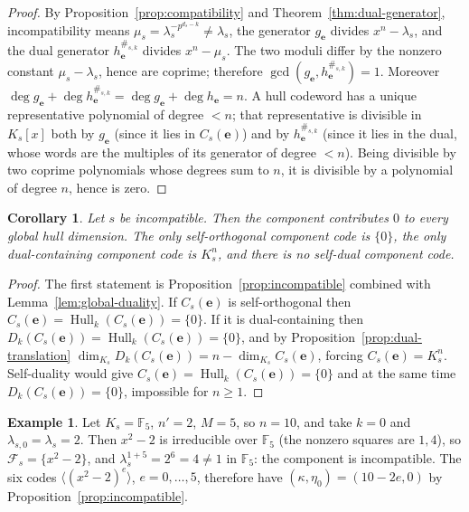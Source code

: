 \documentclass[11pt,a4paper]{article}
\newcommand{\F}{\mathbb F}
\newcommand{\Fs}{\mathcal F_s}
\newcommand{\Hull}{\operatorname{Hull}}
\newcommand{\Dk}{D_k}
\numberwithin{equation}{section}
\theoremstyle{plain}
\newtheorem{corollary}[theorem]{Corollary}
\theoremstyle{definition}
\newtheorem{example}[theorem]{Example}
\theoremstyle{remark}
\begin{document}
\begin{proof}
By Proposition~\ref{prop:compatibility} and Theorem~\ref{thm:dual-generator},
incompatibility means $\mu_s=\lambda_s^{-p^{d_s-k}}\neq\lambda_s$, the generator
$g_{\mathbf{e}}$ divides $x^n-\lambda_s$, and the dual generator
$h_{\mathbf{e}}^{\#_{s,k}}$ divides $x^n-\mu_s$.  The two moduli differ by the
nonzero constant $\mu_s-\lambda_s$, hence are coprime; therefore
$\gcd(g_{\mathbf{e}},h_{\mathbf{e}}^{\#_{s,k}})=1$.  Moreover
$\deg g_{\mathbf{e}}+\deg h_{\mathbf{e}}^{\#_{s,k}}
 =\deg g_{\mathbf{e}}+\deg h_{\mathbf{e}}=n$.
A hull codeword has a unique representative polynomial of degree $<n$; that
representative is divisible in $K_s[x]$ both by $g_{\mathbf{e}}$ (since it lies
in $C_s(\mathbf{e})$) and by $h_{\mathbf{e}}^{\#_{s,k}}$ (since it lies in the
dual, whose words are the multiples of its generator of degree $<n$).  Being
divisible by two coprime polynomials whose degrees sum to $n$, it is divisible
by a polynomial of degree $n$, hence is zero.
\end{proof}

\begin{corollary}\label{cor:incompatible}
Let $s$ be incompatible.  Then the component contributes $0$ to every global
hull dimension.  The only self-orthogonal component code is $\{0\}$, the only
dual-containing component code is $K_s^n$, and there is no self-dual component
code.
\end{corollary}

\begin{proof}
The first statement is Proposition~\ref{prop:incompatible} combined with
Lemma~\ref{lem:global-duality}.  If $C_s(\mathbf{e})$ is self-orthogonal then
$C_s(\mathbf{e})=\Hull_k(C_s(\mathbf{e}))=\{0\}$.  If it is dual-containing then
$\Dk(C_s(\mathbf{e}))=\Hull_k(C_s(\mathbf{e}))=\{0\}$, and by
Proposition~\ref{prop:dual-translation}
$\dim_{K_s}\Dk(C_s(\mathbf{e}))=n-\dim_{K_s}C_s(\mathbf{e})$, forcing
$C_s(\mathbf{e})=K_s^n$.  Self-duality would give
$C_s(\mathbf{e})=\Hull_k(C_s(\mathbf{e}))=\{0\}$ and at the same time
$\Dk(C_s(\mathbf{e}))=\{0\}$, impossible for $n\geq1$.
\end{proof}

\begin{example}\label{ex:incompatible}
Let $K_s=\F_5$, $n'=2$, $M=5$, so $n=10$, and take $k=0$ and
$\lambda_{s,0}=\lambda_s=2$.  Then $x^2-2$ is irreducible over $\F_5$ (the
nonzero squares are $1,4$), so $\Fs=\{x^2-2\}$, and
$\lambda_s^{1+5}=2^6=4\neq1$ in $\F_5$: the component is incompatible.  The six
codes $\langle(x^2-2)^e\rangle$, $e=0,\ldots,5$, therefore have
$(\kappa,\eta_0)=(10-2e,0)$ by Proposition~\ref{prop:incompatible}.
\end{example}
\end{document}
